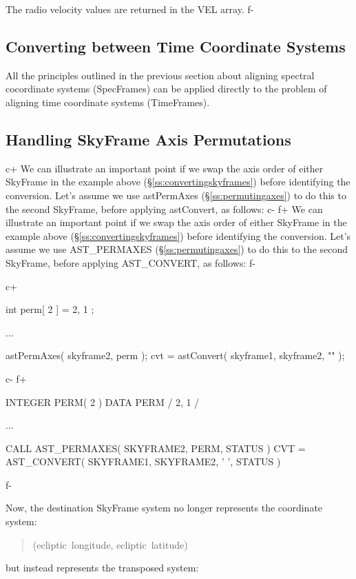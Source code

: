 \documentclass[twoside,11pt]{starlink}
\providecommand{\secref}[1]{\S\ref{#1}}
\begin{document}
The radio velocity values are returned in the VEL array.
f-

\subsection{Converting between Time Coordinate Systems}
All the principles outlined in the previous section about aligning
spectral cocordinate systems (SpecFrames) can be applied directly to the
problem of aligning time coordinate systems (TimeFrames).

\subsection{\label{ss:convertingpermutedaxes}Handling SkyFrame Axis Permutations}

c+
We can illustrate an important point if we swap the axis order of
either SkyFrame in the example above (\secref{ss:convertingskyframes})
before identifying the conversion. Let's assume we use astPermAxes
(\secref{ss:permutingaxes}) to do this to the second SkyFrame, before
applying astConvert, as follows:
c-
f+
We can illustrate an important point if we swap the axis order of
either SkyFrame in the example above (\secref{ss:convertingskyframes})
before identifying the conversion. Let's assume we use AST\_PERMAXES
(\secref{ss:permutingaxes}) to do this to the second SkyFrame, before
applying AST\_CONVERT, as follows:
f-

c+
\small
\begin{terminalv}
int perm[ 2 ] = { 2, 1 };

...

astPermAxes( skyframe2, perm );
cvt = astConvert( skyframe1, skyframe2, "" );
\end{terminalv}
\normalsize
c-
f+
\small
\begin{terminalv}
      INTEGER PERM( 2 )
      DATA PERM / 2, 1 /

      ...

      CALL AST_PERMAXES( SKYFRAME2, PERM, STATUS )
      CVT = AST_CONVERT( SKYFRAME1, SKYFRAME2, ' ', STATUS )
\end{terminalv}
\normalsize
f-

Now, the destination SkyFrame system no longer represents the
coordinate system:

\begin{quote}
(ecliptic~longitude, ecliptic~latitude)
\end{quote}

but instead represents the transposed system:
\end{document}
